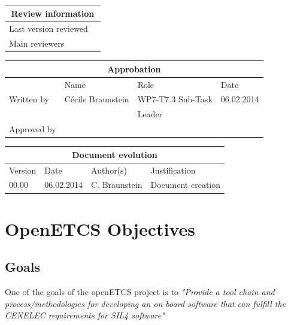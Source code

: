 \documentclass{openetcs_report}
\begin{document}
\begin{tabular}{|p{4.4cm}|p{8.7cm}|}
\hline
\multicolumn{2}{|c|}{Review information} \\
\hline
Last version reviewed &  \\
\hline
Main reviewers &  \\
\hline
\end{tabular}

\begin{tabular}{|p{2.2cm}|p{4cm}|p{4cm}|p{2cm}|}
\hline
\multicolumn{4}{|c|}{Approbation} \\
\hline
  &  Name & Role & Date   \\
\hline  
Written by    &  Cécile Braunstein & WP7-T7.3 Sub-Task  & 06.02.2014 \\
&  & Leader&\\
\hline
Approved by &  &   &  \\
\hline
\end{tabular}

\begin{tabular}{|p{2.2cm}|p{2cm}|p{3cm}|p{5cm}|}
\hline
\multicolumn{4}{|c|}{Document evolution} \\
\hline
Version &  Date & Author(s) & Justification  \\
\hline  
00.00 & 06.02.2014 & C. Braunstein  &  Document creation  \\


\hline  
\end{tabular}
\newpage


\mainmatter







\chapter{OpenETCS Objectives}
\label{chap-1}
\section{Goals}
\label{sec-1-1}
One of the goals of the openETCS project is to {\em "Provide a tool chain and process/methodologies for developing an on-board software that can fulfill the CENELEC requirements for SIL4 software"}
\end{document}
